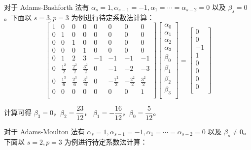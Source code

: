 \documentclass[a4paper]{article}
\begin{document}
\par 对于 Adams-Bashforth 法有 $\alpha_s=1, \alpha_{s-1}=-1, 
\alpha_1=\cdots=\alpha_{s-2}=0$ 以及 
$\beta_s=0$。下面以 $s=3, p=3$ 为例进行待定系数法计算：
\begin{equation}
    \begin{bmatrix}
        1 & 0 & 0 & 0 & 0 & 0 & 0 & 0\\
        0 & 1 & 0 & 0 & 0 & 0 & 0 & 0\\
        0 & 0 & 1 & 0 & 0 & 0 & 0 & 0\\
        0 & 0 & 0 & 1 & 0 & 0 & 0 & 0\\
        0 & 1 & 2 & 3 & -1 & -1 & -1 & -1\\
        0 & \frac{1^2}{2} & \frac{2^2}{2} & \frac{3^2}{2} & 0 & -1 & -2 & -3\\
        0 & \frac{1^3}{6} & \frac{2^3}{6} & \frac{3^3}{6} & 0 & -\frac{1^2}{2} & -\frac{2^2}{2} & \frac{3^2}{2}\\
        0 & 0 & 0 & 0 & 0 & 0 & 0 & 1\\
    \end{bmatrix}
    \begin{bmatrix}
        \alpha_0\\
        \alpha_1\\
        \alpha_2\\
        \alpha_3\\
        \beta_0\\
        \beta_1\\
        \beta_2\\
        \beta_3\\
    \end{bmatrix}
    =
    \begin{bmatrix}
        0\\
        0\\
        -1\\
        1\\
        0\\
        0\\
        0\\
        0\\
    \end{bmatrix}
\end{equation}
\par 计算可得 $\beta_3=0$，$\beta_2=\dfrac{23}{12}$，
$\beta_1=-\dfrac{16}{12}$，$\beta_0=\dfrac{5}{12}$。
\par 对于 Adams-Moulton 法有 $\alpha_s=1, \alpha_{s-1}=-1, 
\alpha_1=\cdots=\alpha_{s-2}=0$
以及 $\beta_s\neq 0$。下面以 $s=2, p=3$ 为例进行待定系数法计算：
\end{document}
